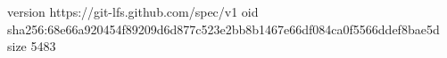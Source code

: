version https://git-lfs.github.com/spec/v1
oid sha256:68e66a920454f89209d6d877c523e2bb8b1467e66df084ca0f5566ddef8bae5d
size 5483
